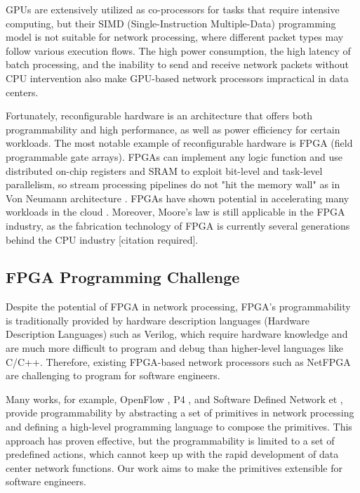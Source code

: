 GPUs are extensively utilized as co-processors for tasks that require intensive computing, but their SIMD (Single-Instruction Multiple-Data) programming model is not suitable for network processing, where different packet types may follow various execution flows. The high power consumption, the high latency of batch processing, and the inability to send and receive network packets without CPU intervention also make GPU-based network processors impractical in data centers.

Fortunately, reconfigurable hardware is an architecture that offers both programmability and high performance, as well as power efficiency for certain workloads. The most notable example of reconfigurable hardware is FPGA (field programmable gate arrays). FPGAs can implement any logic function and use distributed on-chip registers and SRAM to exploit bit-level and task-level parallelism, so stream processing pipelines do not "hit the memory wall" as in Von Neumann architecture \cite{bacon2013fpga}. FPGAs have shown potential in accelerating many workloads in the cloud \cite{putnam2014reconfigurable}. Moreover, Moore's law is still applicable in the FPGA industry, as the fabrication technology of FPGA is currently several generations behind the CPU industry [citation required].

\subsection{FPGA Programming Challenge}

Despite the potential of FPGA in network processing, FPGA's programmability is traditionally provided by hardware description languages (Hardware Description Languages) such as Verilog, which require hardware knowledge and are much more difficult to program and debug than higher-level languages like C/C++. Therefore, existing FPGA-based network processors such as NetFPGA \cite{lockwood2007netfpga} are challenging to program for software engineers.

Many works, for example, OpenFlow \cite{mckeown2008openflow}, P4 \cite{bosshart2014p4}, and Software Defined Network et \cite{xilinxsdnet}, provide programmability by abstracting a set of primitives in network processing and defining a high-level programming language to compose the primitives. This approach has proven effective, but the programmability is limited to a set of predefined actions, which cannot keep up with the rapid development of data center network functions. Our work aims to make the primitives extensible for software engineers.

